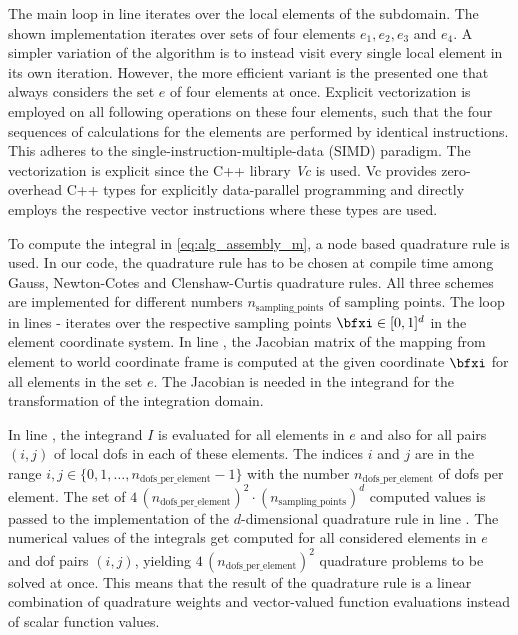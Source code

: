 The main loop in line  iterates over the local elements of the subdomain. 
The shown implementation iterates over sets of four elements $e_1,e_2,e_3$ and $e_4$. A simpler variation of the algorithm is to instead visit every single local element in its own iteration.
However, the more efficient variant is the presented one that always considers the set $e$ of four elements at once. 
Explicit vectorization is employed on all following operations on these four elements, such that 
the four sequences of calculations for the elements are performed by identical instructions. This adheres to the single-instruction-multiple-data (SIMD) paradigm. The vectorization is explicit since the C++ library \emph{Vc} \cite{vc2012,Kretz2015} is used. Vc provides zero-overhead C++ types for explicitly data-parallel programming and directly employs the respective vector instructions where these types are used.

To compute the integral in \cref{eq:alg_assembly_m}, a node based quadrature rule is used. In our code, the quadrature rule has to be chosen at compile time among Gauss, Newton-Cotes and Clenshaw-Curtis quadrature rules. All three schemes are implemented for different numbers $n_\text{sampling\_points}$ of sampling points. The loop in lines  -  iterates over the respective sampling points $\bfxi \in [0,1]^d$ in the element coordinate system. In line , the Jacobian matrix of the mapping from element to world coordinate frame is computed at the given coordinate $\bfxi$ for all elements in the set $e$. The Jacobian is needed in the integrand for the transformation of the integration domain.

In line , the integrand $I$ is evaluated for all elements in $e$ and also for all pairs $(i,j)$ of local dofs in each of these elements. The indices $i$ and $j$ are in the range $i,j \in \{0,1,\dots,n_\text{dofs\_per\_element}-1\}$ with the number $n_\text{dofs\_per\_element}$ of dofs per element. The set of $4\,(n_\text{dofs\_per\_element})^2\cdot (n_\text{sampling\_points})^d$ computed values is passed to the implementation of the $d$-dimensional quadrature rule in line . The numerical values of the integrals get computed for all considered elements in $e$ and dof pairs $(i,j)$, yielding $4\,(n_\text{dofs\_per\_element})^2$ quadrature problems to be solved at once. This means that the result of the quadrature rule is a linear combination of quadrature weights and vector-valued function evaluations instead of scalar function values.

